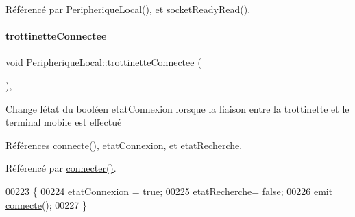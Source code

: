 Référencé par \hyperlink{class_peripherique_local_a99a652b8659a3692f164cf1a0382e4bf}{Peripherique\+Local()}, et \hyperlink{class_peripherique_local_a48840475209b5cabcf60e3176de63b92}{socket\+Ready\+Read()}.

\mbox{\label{class_peripherique_local_ad6e76380e6c9f48c36a10ac4af2c3d96}} 
\paragraph{\texorpdfstring{trottinette\+Connectee}{trottinetteConnectee}}
{\footnotesize\ttfamily void Peripherique\+Local\+::trottinette\+Connectee (\begin{DoxyParamCaption}{ }\end{DoxyParamCaption})\hspace{0.3cm}{\ttfamily [protected]}, {\ttfamily [slot]}}

Change l\textquotesingle{}état du booléen etat\+Connexion lorsque la liaison entre la trottinette et le terminal mobile est effectué 

Références \hyperlink{class_peripherique_local_a7495daea266cb24dec35d85c651bd4c5}{connecte()}, \hyperlink{class_peripherique_local_a5359e5a94b32b8a90c06ec999de13d2c}{etat\+Connexion}, et \hyperlink{class_peripherique_local_a6638c29f6f75c3b4d329d93ae6ea4a48}{etat\+Recherche}.



Référencé par \hyperlink{class_peripherique_local_af2e7f023f8ed72ebc1d36e66c440ceca}{connecter()}.


\begin{DoxyCode}
00223 \{
00224     \hyperlink{class_peripherique_local_a5359e5a94b32b8a90c06ec999de13d2c}{etatConnexion} = \textcolor{keyword}{true};
00225     \hyperlink{class_peripherique_local_a6638c29f6f75c3b4d329d93ae6ea4a48}{etatRecherche}= \textcolor{keyword}{false};
00226     emit \hyperlink{class_peripherique_local_a7495daea266cb24dec35d85c651bd4c5}{connecte}();
00227 \}
\end{DoxyCode}
\mbox{\label{class_peripherique_local_ab081485bf0f9403d9e7fc5f0407cdc5c}} 
